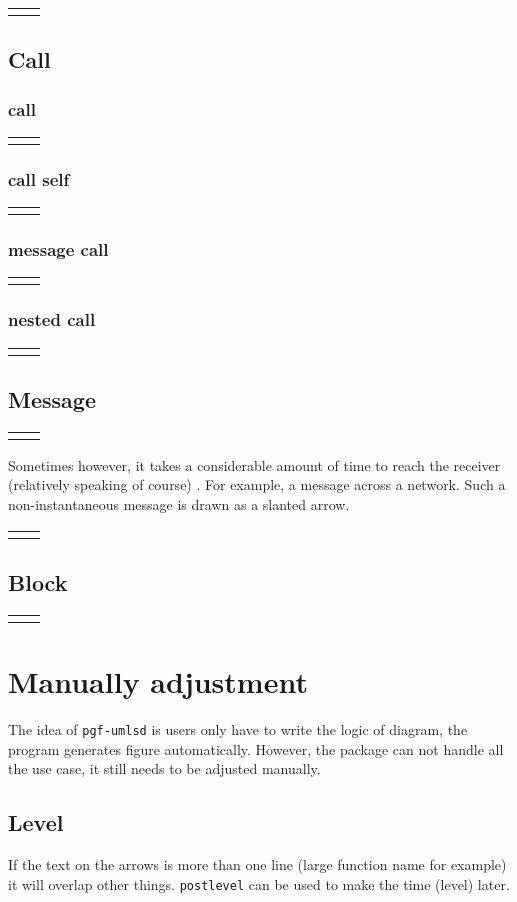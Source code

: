\documentclass{article}
\newcommand{\demo}[2][1]{
  \begin{center}
  \begin{tabular}{cc}
    \begin{minipage}{.49\linewidth}
      \centering
      \resizebox{#1\linewidth}{!}{
        
      }
    \end{minipage}
    &
    \begin{minipage}{.45\linewidth}
      
    \end{minipage}
  \end{tabular}
  \end{center}
}
\begin{document}
\demo{customize}


\subsection{Call}
\subsubsection{call}
\demo[0.6]{call}

\subsubsection{call self}
\demo[0.6]{callself}

\subsubsection{message call}
\demo[0.6]{messcall}

\subsubsection{nested call}
\demo[0.6]{nested-call}

\subsection{Message}
\demo[0.6]{message}

Sometimes however, it takes a considerable amount of time to reach the
receiver (relatively speaking of course) . For example, a message
across a network. Such a non-instantaneous message is drawn as a
slanted arrow.

\demo[0.6]{non-instantaneous-message}

\subsection{Block}
\demo[0.6]{block}

\section{Manually adjustment}
The idea of \texttt{pgf-umlsd} is users only have to write the logic
of diagram, the program generates figure automatically. However, the
package can not handle all the use case, it still needs to be adjusted
manually.

\subsection{Level}
If the text on the arrows is more than one line (large function name
for example) it will overlap other things. \texttt{postlevel} can be
used to make the time (level) later.
\end{document}
